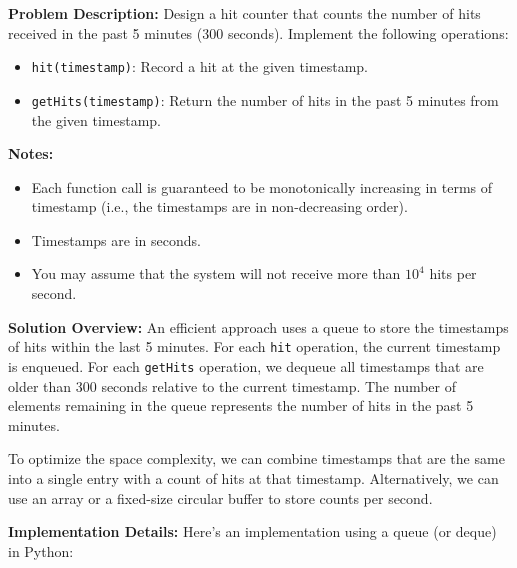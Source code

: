 
\textbf{Problem Description:}  
Design a hit counter that counts the number of hits received in the past 5 minutes (300 seconds). Implement the following operations:
\begin{itemize}
    \item \texttt{hit(timestamp)}: Record a hit at the given timestamp.
    \item \texttt{getHits(timestamp)}: Return the number of hits in the past 5 minutes from the given timestamp.
\end{itemize}

\textbf{Notes:}
\begin{itemize}
    \item Each function call is guaranteed to be monotonically increasing in terms of timestamp (i.e., the timestamps are in non-decreasing order).
    \item Timestamps are in seconds.
    \item You may assume that the system will not receive more than $10^4$ hits per second.
\end{itemize}


\textbf{Solution Overview:}  
An efficient approach uses a queue to store the timestamps of hits within the last 5 minutes. For each \texttt{hit} operation, the current timestamp is enqueued. For each \texttt{getHits} operation, we dequeue all timestamps that are older than 300 seconds relative to the current timestamp. The number of elements remaining in the queue represents the number of hits in the past 5 minutes.

To optimize the space complexity, we can combine timestamps that are the same into a single entry with a count of hits at that timestamp. Alternatively, we can use an array or a fixed-size circular buffer to store counts per second.

\textbf{Implementation Details:}  
Here's an implementation using a queue (or deque) in Python:

